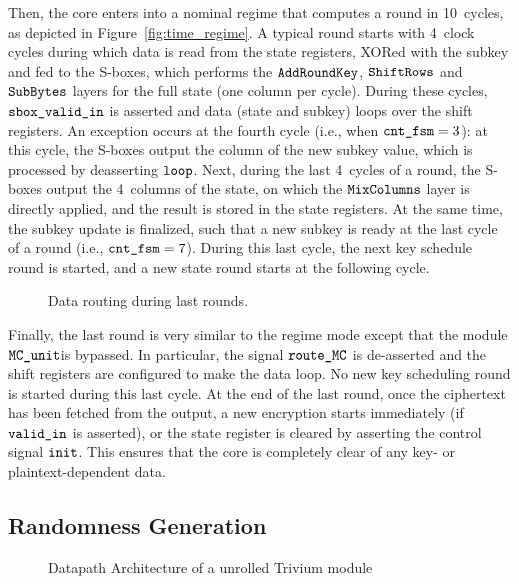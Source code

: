 \documentclass{scrartcl}
\begin{document}
Then, the core enters into a nominal regime that computes a round in 10~cycles,
as depicted in Figure~\ref{fig:time_regime}.
A typical round starts with 4~clock cycles during which data is read from the
state registers, XORed with the subkey and fed to the S-boxes, which performs
the $\texttt{AddRoundKey}$, $\texttt{ShiftRows}$ and $\texttt{SubBytes}$ layers for the full state (one column per cycle).
During these cycles, $\texttt{sbox\_valid\_in}$ is asserted and data (state and subkey)
loops over the shift registers.
An exception occurs at the fourth cycle (i.e., 
when $\texttt{cnt\_fsm}=3$): at this cycle, the S-boxes output the column of the
new subkey value, which is processed by deasserting $\texttt{loop}$.  Next,
during the last 4~cycles of a round, the S-boxes output the 4~columns of the
state, on which the $\texttt{MixColumns}$ layer is directly applied, and the result is stored
in the state registers. At the same time, the subkey update is finalized, such
that a new subkey is ready at the last cycle of a round (i.e.,
$\texttt{cnt\_fsm}=7$). During this last cycle, the next key schedule round is
started, and a new state round starts at the following cycle.

\begin{figure}
    \centering
     
    \caption{Data routing during last rounds.}
    \label{fig:time_last_round}
\end{figure}

Finally, the last round is very similar to the regime mode except that the
module $\texttt{MC\_unit}$is bypassed. In particular, the signal
$\texttt{route\_MC}$ is de-asserted and the shift registers are configured to
make the data loop. No new key scheduling round is started during this last
cycle.
At the end of the last round, once the ciphertext has been fetched from the
output, a new encryption starts immediately (if $\texttt{valid\_in}$ is asserted),
or the state register is cleared by asserting the control signal
$\texttt{init}$.
This ensures that the core is completely clear of any key- or
plaintext-dependent data.

\subsection{Randomness Generation} 


\begin{figure}
    \centering
    \resizebox{\textwidth}{!}{
        \begin{tikzpicture}
            
        \end{tikzpicture}
    }
    \caption{Datapath Architecture of a unrolled Trivium module}
    \label{fig:prng}
\end{figure}
\end{document}
